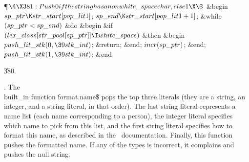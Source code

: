 \Y\P$\4\X381:Push 0 if the string has a non\\{white\_space} char, else 1\X\S$\6
\&{begin} $\\{sp\_ptr}\K\\{str\_start}[\\{pop\_lit1}]$;\5
$\\{sp\_end}\K\\{str\_start}[\\{pop\_lit1}+1]$;\6
\&{while} $(\\{sp\_ptr}<\\{sp\_end})$ \1\&{do}\6
\&{begin} \&{if} $(\\{lex\_class}[\\{str\_pool}[\\{sp\_ptr}]]\I\\{white%
\_space})$ \1\&{then}\6
\&{begin} $\\{push\_lit\_stk}(0,\39\\{stk\_int})$;\5
\&{return};\6
\&{end};\2\6
$\\{incr}(\\{sp\_ptr})$;\6
\&{end};\2\6
$\\{push\_lit\_stk}(1,\39\\{stk\_int})$;\6
\&{end}\par
\U380.\fi

.
The \\{built\_in} function {\.{format.name\$}} pops the top three
literals (they are a string, an integer, and a string literal, in that
order).  The last string literal represents a name list (each name
corresponding to a person), the integer literal specifies which name
to pick from this list, and the first string literal specifies how to
format this name, as described in the \BibTeX\ documentation.
Finally, this function pushes the formatted name.  If any of the types
is incorrect, it complains and pushes the null string.

